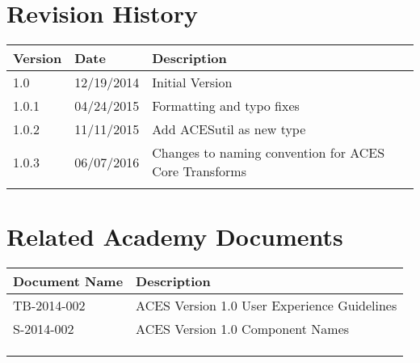 \prelimsectionformat	%
\chapter{Revision History}

\begin{tabularx}{\linewidth}{|l|l|X|}
    \hline
    Version & Date & Description \\ \hline
    1.0     & 12/19/2014     & Initial Version      \\ \hline
    1.0.1   & 04/24/2015     & Formatting and typo fixes \\ \hline
    1.0.2   & 11/11/2015     & Add ACESutil as new type  \\ \hline
    1.0.3   & 06/07/2016     & Changes to naming convention for ACES Core Transforms \\ \hline
            &      &             \\ \hline
\end{tabularx}

\vspace{0.25in} %
\chapter{Related Academy Documents} %
\begin{tabularx}{\linewidth}{|l|X|}
    \hline
    Document Name & Description \\ \hline
    TB-2014-002  & ACES Version 1.0 User Experience Guidelines \\ \hline
    S-2014-002  & ACES Version 1.0 Component Names \\ \hline
    & \\ \hline
    & \\ \hline
    & \\ \hline
\end{tabularx}